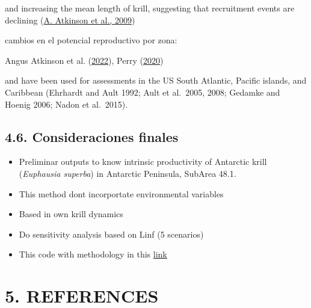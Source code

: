 \documentclass[
]{article}
\begin{document}
and increasing the mean length of krill, suggesting that recruitment
events are declining (\protect\hyperlink{ref-Atkinson2009}{A. Atkinson
et al., 2009})

cambios en el potencial reproductivo por zona:

Angus Atkinson et al. (\protect\hyperlink{ref-Atkinson2022}{2022}),
Perry (\protect\hyperlink{ref-Perry2020}{2020})

and have been used for assessments in the US South Atlantic, Pacific
islands, and Caribbean (Ehrhardt and Ault 1992; Ault et al.~2005, 2008;
Gedamke and Hoenig 2006; Nadon et al.~2015).

\hypertarget{consideraciones-finales}{%
\subsection{4.6. Consideraciones
finales}\label{consideraciones-finales}}

\begin{itemize}
\item
  Preliminar outputs to know intrinsic productivity of Antarctic krill
  (\emph{Euphausia superba}) in Antarctic Peninsula, SubArea 48.1.
\item
  This method dont incorportate environmental variables
\item
  Based in own krill dynamics
\item
  Do sensitivity analysis based on Linf (5 scenarios)
\item
  This code with methodology in this
  \href{https://github.com/MauroMardones/LBSPR_Krill}{link}
\end{itemize}

\newpage

\hypertarget{references}{%
\section*{5. REFERENCES}\label{references}}
\end{document}
